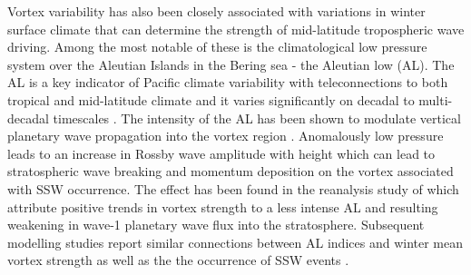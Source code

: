 Vortex variability has also been closely associated with variations in winter surface climate that can determine the strength of mid-latitude tropospheric wave driving. Among the most notable of these is the climatological low pressure system over the Aleutian Islands in the Bering sea - the Aleutian low (AL). The AL is a key indicator of Pacific climate variability with teleconnections to both tropical and mid-latitude climate \citep{Nitta1989, Trenberth1994, zhangENSOlike1997} and it varies significantly on decadal to multi-decadal timescales \citep{overlandDecadal1999b}. The intensity of the AL has been shown to modulate vertical planetary wave propagation into the vortex region \citep{wooConnection2015b, garfinkelTropospheric2010b, manziniInfluence2006b}. Anomalously low pressure leads to an increase in Rossby wave amplitude with height \citep{wooConnection2015b} which can lead to stratospheric wave breaking and momentum deposition on the vortex associated with SSW occurrence. The effect has been found in the reanalysis study of \cite{huDecadal2018b} which attribute positive trends in vortex strength to a less intense AL and resulting weakening in wave-1 planetary wave flux into the stratosphere. Subsequent modelling studies report similar connections between AL indices and winter mean vortex strength as well as the the occurrence of SSW events \citep{krenWintertime2016b}. 

